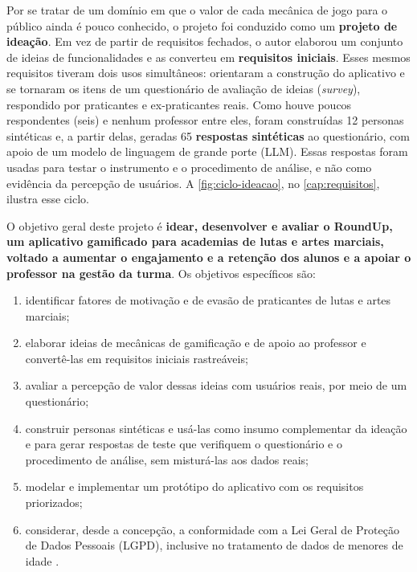Por se tratar de um domínio em que o valor de cada mecânica de jogo para
o público ainda é pouco conhecido, o projeto foi conduzido como um
\textbf{projeto de ideação}. Em vez de partir de requisitos fechados, o
autor elaborou um conjunto de ideias de funcionalidades e as converteu em
\textbf{requisitos iniciais}. Esses mesmos requisitos tiveram dois usos
simultâneos: orientaram a construção do aplicativo e se tornaram os itens
de um questionário de avaliação de ideias (\textit{survey}), respondido
por praticantes e ex-praticantes reais. Como houve poucos respondentes
(seis) e nenhum professor entre eles, foram construídas 12 personas
sintéticas e, a partir delas, geradas 65 \textbf{respostas sintéticas} ao
questionário, com apoio de um modelo de linguagem de grande porte (LLM).
Essas respostas foram usadas para testar o instrumento e o procedimento
de análise, e não como evidência da percepção de usuários. A \autoref{fig:ciclo-ideacao}, no
\autoref{cap:requisitos}, ilustra esse ciclo.

O objetivo geral deste projeto é \textbf{idear, desenvolver e avaliar o
RoundUp, um aplicativo gamificado para academias de lutas e artes
marciais, voltado a aumentar o engajamento e a retenção dos alunos e a
apoiar o professor na gestão da turma}. Os objetivos específicos são:

\begin{enumerate}
  \item identificar fatores de motivação e de evasão de praticantes de
        lutas e artes marciais;
  \item elaborar ideias de mecânicas de gamificação e de apoio ao
        professor e convertê-las em requisitos iniciais rastreáveis;
  \item avaliar a percepção de valor dessas ideias com usuários reais,
        por meio de um questionário;
  \item construir personas sintéticas e usá-las como insumo
        complementar da ideação e para gerar respostas de teste que
        verifiquem o questionário e o procedimento de análise, sem
        misturá-las aos dados reais;
  \item modelar e implementar um protótipo do aplicativo com os
        requisitos priorizados;
  \item considerar, desde a concepção, a conformidade com a Lei Geral de
        Proteção de Dados Pessoais (LGPD), inclusive no tratamento de dados
        de menores de idade \cite{lgpd2018}.
\end{enumerate}

